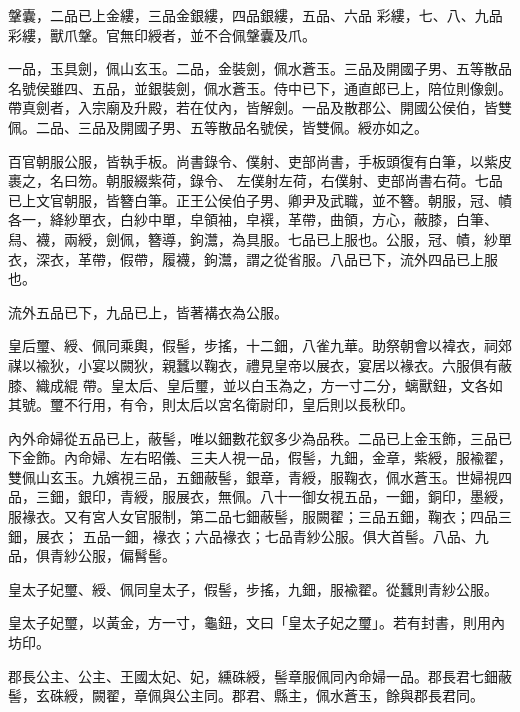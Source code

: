 \begin{pinyinscope}
 鞶囊，二品已上金縷，三品金銀縷，四品銀縷，五品、六品
 彩縷，七、八、九品彩縷，獸爪鞶。官無印綬者，並不合佩鞶囊及爪。



 一品，玉具劍，佩山玄玉。二品，金裝劍，佩水蒼玉。三品及開國子男、五等散品名號侯雖四、五品，並銀裝劍，佩水蒼玉。侍中已下，通直郎已上，陪位則像劍。帶真劍者，入宗廟及升殿，若在仗內，皆解劍。一品及散郡公、開國公侯伯，皆雙佩。二品、三品及開國子男、五等散品名號侯，皆雙佩。綬亦如之。



 百官朝服公服，皆執手板。尚書錄令、僕射、吏部尚書，手板頭復有白筆，以紫皮裹之，名曰笏。朝服綴紫荷，錄令、
 左僕射左荷，右僕射、吏部尚書右荷。七品已上文官朝服，皆簪白筆。正王公侯伯子男、卿尹及武職，並不簪。朝服，冠、幘各一，絳紗單衣，白紗中單，皁領袖，皁襈，革帶，曲領，方心，蔽膝，白筆、舄、襪，兩綬，劍佩，簪導，鉤灊，為具服。七品已上服也。公服，冠、幘，紗單衣，深衣，革帶，假帶，履襪，鉤灊，謂之從省服。八品已下，流外四品已上服也。



 流外五品已下，九品已上，皆著褠衣為公服。



 皇后璽、綬、佩同乘輿，假髻，步搖，十二鈿，八雀九華。助祭朝會以褘衣，祠郊禖以褕狄，小宴以闕狄，親蠶以鞠衣，禮見皇帝以展衣，宴居以褖衣。六服俱有蔽膝、織成緄
 帶。皇太后、皇后璽，並以白玉為之，方一寸二分，螭獸鈕，文各如其號。璽不行用，有令，則太后以宮名衛尉印，皇后則以長秋印。



 內外命婦從五品已上，蔽髻，唯以鈿數花釵多少為品秩。二品已上金玉飾，三品已下金飾。內命婦、左右昭儀、三夫人視一品，假髻，九鈿，金章，紫綬，服褕翟，雙佩山玄玉。九嬪視三品，五鈿蔽髻，銀章，青綬，服鞠衣，佩水蒼玉。世婦視四品，三鈿，銀印，青綬，服展衣，無佩。八十一御女視五品，一鈿，銅印，墨綬，服褖衣。又有宮人女官服制，第二品七鈿蔽髻，服闕翟；三品五鈿，鞠衣；四品三鈿，展衣；
 五品一鈿，褖衣；六品褖衣；七品青紗公服。俱大首髻。八品、九品，俱青紗公服，偏髾髻。



 皇太子妃璽、綬、佩同皇太子，假髻，步搖，九鈿，服褕翟。從蠶則青紗公服。



 皇太子妃璽，以黃金，方一寸，龜鈕，文曰「皇太子妃之璽」。若有封書，則用內坊印。



 郡長公主、公主、王國太妃、妃，纁硃綬，髻章服佩同內命婦一品。郡長君七鈿蔽髻，玄硃綬，闕翟，章佩與公主同。郡君、縣主，佩水蒼玉，餘與郡長君同。




\end{pinyinscope}

